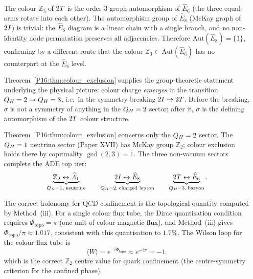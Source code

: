\begin{remark}
\label{P16:rem:dynkin_colour}
The colour $\mathbb{Z}_3$ of $2T$ is the order-$3$ graph automorphism
of $\widehat{E}_6$ (the three equal arms rotate into each other).
The automorphism group of $\widehat{E}_8$ (McKay graph of $2I$) is
trivial: the $\widehat{E}_8$ diagram is a linear chain with a single
branch, and no non-identity node permutation preserves all adjacencies.
Therefore $\mathrm{Aut}(\widehat{E}_8)=\{1\}$, confirming by a different
route that the colour $\mathbb{Z}_3\subset\mathrm{Aut}(\widehat{E}_6)$
has no counterpart at the $\widehat{E}_8$ level.
\end{remark}

\begin{remark}[Colour emergence in the $\QH=2\to\QH=3$ transition]
\label{P16:rem:symmetry_breaking_colour}
Theorem~\ref{P16:thm:colour_exclusion} supplies the group-theoretic statement
underlying the physical picture: colour charge \emph{emerges} in the
transition $\QH=2\to\QH=3$, i.e.\ in the symmetry breaking
$2I\to2T$. Before the breaking, $\sigma$ is not a symmetry of
anything in the $Q_H=2$ sector; after it, $\sigma$ is the defining
automorphism of the $2T$ colour structure.
\end{remark}

\begin{remark}[The $\QH=1$ sector and the complete ADE hierarchy]
\label{P16:rem:qh1_preview}
Theorem~\ref{P16:thm:colour_exclusion} concerns only the $Q_H=2$ sector.
The $\QH=1$ neutrino sector (Paper XVII) has McKay group $\mathbb{Z}_2$;
colour exclusion holds there by coprimality $\gcd(2,3)=1$.
The three non-vacuum sectors complete the ADE top tier:
\[
  \underbrace{\mathbb{Z}_2\leftrightarrow\widehat{A}_1}_{Q_H=1,\;\text{neutrino}}
  \qquad
  \underbrace{2I\leftrightarrow\widehat{E}_8}_{Q_H=2,\;\text{charged lepton}}
  \qquad
  \underbrace{2T\leftrightarrow\widehat{E}_6}_{Q_H=3,\;\text{baryon}}.
\]
\end{remark}

\begin{proposition}
\label{P5:prop:holonomy}
The correct holonomy for QCD confinement is the topological quantity
computed by Method~(iii).
For a single colour flux tube, the Dirac quantisation condition
requires $\Phi_{\mathrm{topo}} = \pi$ (one unit of colour magnetic
flux), and Method~(iii) gives $\Phi_{\mathrm{topo}}/\pi\approx1.017$,
consistent with this quantisation to $1.7\%$.
The Wilson loop for the colour flux tube is
\begin{equation}
  \langle W\rangle
  = e^{-i\Phi_{\mathrm{topo}}}
  \approx e^{-i\pi}
  = -1,
  \label{P15:eq:Wilson_loop}
\end{equation}
which is the correct $\mathbb{Z}_2$ centre value for quark confinement
(the centre-symmetry criterion for the confined phase).
\end{proposition}

